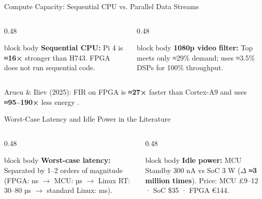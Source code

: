 \begin{frame}{Compute Capacity: Sequential CPU vs. Parallel Data Streams}
\begin{columns}[T]
\begin{column}{0.48\linewidth}\centering
{}
\vspace{-4pt}
\begin{beamercolorbox}[rounded=true,sep=3pt]{block body}\scriptsize
\textbf{Sequential CPU:} \SoC{} Pi 4 is \textbf{≈16×} stronger than \MCU{} H743. FPGA does not run sequential code.
\end{beamercolorbox}
\end{column}
\begin{column}{0.48\linewidth}\centering
{}
\vspace{-4pt}
\begin{beamercolorbox}[rounded=true,sep=3pt]{block body}\scriptsize
\textbf{1080p video filter:} Top \MCU{} meets only ≈29\% demand; \FPGA{} uses ≈3.5\% DSPs for 100\% throughput.
\end{beamercolorbox}
\end{column}
\end{columns}
\vfill
\scriptsize\centering\textcolor{cInk2}{Arucu \& Iliev (2025): FIR on FPGA is \textbf{≈27×} faster than Cortex-A9 and uses \textbf{≈95–190×} less energy .}
\end{frame}

\begin{frame}{Worst-Case Latency and Idle Power in the Literature}
\begin{columns}[T]
\begin{column}{0.48\linewidth}\centering
{}
\vspace{-4pt}
\begin{beamercolorbox}[rounded=true,sep=3pt]{block body}\scriptsize
\textbf{Worst-case latency:} Separated by 1–2 orders of magnitude (FPGA: ns $\rightarrow$ MCU: µs $\rightarrow$ Linux RT: 30–80 µs $\rightarrow$ standard Linux: ms).
\end{beamercolorbox}
\end{column}
\begin{column}{0.48\linewidth}\centering
{}
\vspace{-4pt}
\begin{beamercolorbox}[rounded=true,sep=3pt]{block body}\scriptsize
\textbf{Idle power:} MCU Standby 300 nA vs SoC 3 W ($\Delta$ \textbf{≈3 million times}). Price: MCU £9–12 · SoC \$35 · FPGA €144.
\end{beamercolorbox}
\end{column}
\end{columns}
\end{frame}

